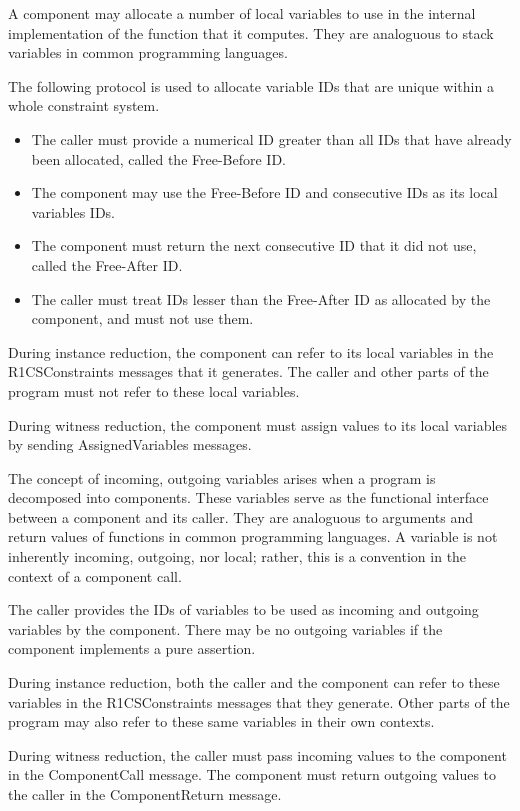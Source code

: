	A component may allocate a number of local variables to use
	in the internal implementation of the function that it computes.
	They are analoguous to stack variables in common programming languages.

	The following protocol is used to allocate variable IDs that are
	unique within a whole constraint system.
	\begin{itemize}
		\item The caller must provide a numerical ID greater than all IDs that have already been allocated, called the Free-Before ID.
		\item The component may use the Free-Before ID and consecutive IDs as its local variables IDs.
		\item The component must return the next consecutive ID that it did not use, called the Free-After ID.
		\item The caller must treat IDs lesser than the Free-After ID as allocated by the component,
			and must not use them.
	\end{itemize}

	During instance reduction, the component can refer to
	its local variables in the R1CSConstraints messages that it generates.
	The caller and other parts of the program must not refer to these local variables.

	During witness reduction, the component must assign values to its local variables
	by sending AssignedVariables messages.


	The concept of incoming, outgoing variables arises when a program is decomposed into components.
	These variables serve as the functional interface between a component and its caller.
	They are analoguous to arguments and return values of functions in common programming languages.
	A variable is not inherently incoming, outgoing, nor local;
	rather, this is a convention in the context of a component call.

	The caller provides the IDs of variables to be used as incoming and outgoing variables by the component.
	There may be no outgoing variables if the component implements a pure assertion.

	During instance reduction, both the caller and the component can refer to
	these variables in the R1CSConstraints messages that they generate.
	Other parts of the program may also refer to these same variables in their own contexts.

	During witness reduction, the caller must pass incoming values to the component in the ComponentCall message.
	The component must return outgoing values to the caller in the ComponentReturn message.

